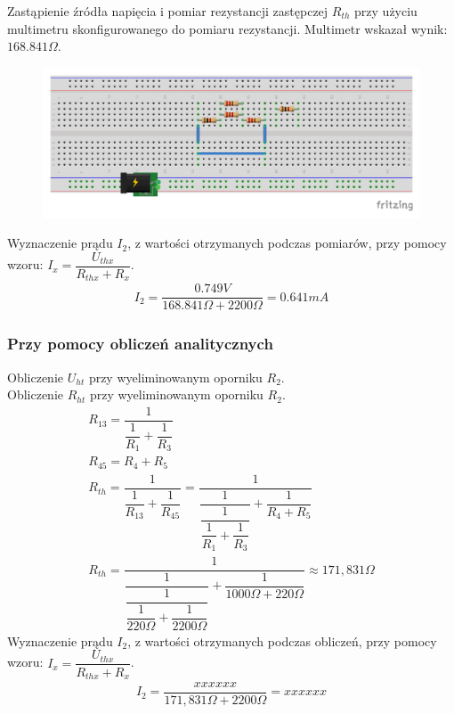 \documentclass[polish,polish,a4paper]{article}
\begin{document}
\begin{spacing}{2}
		Zastąpienie źródła napięcia i pomiar rezystancji zastępczej $R_{th}$ przy użyciu multimetru skonfigurowanego do pomiaru rezystancji. Multimetr wskazał wynik: $ 168.841\Omega $.
		\begin{figure}[H]
			\centering
			\includegraphics[scale=0.8]{R2_pomiar_oporu_bb.pdf}
		\end{figure}
		Wyznaczenie prądu $I_{2}$, z wartości otrzymanych podczas pomiarów, przy pomocy wzoru: $I_{x}= \dfrac{U_{thx}}{R_{thx} + R_{x}}$.
		\begin{gather*}
		I_{2}=\dfrac{0.749V}{168.841\Omega + 2200\Omega } = 0.641mA
		\end{gather*}
	\subsubsection{Przy pomocy obliczeń analitycznych}
	Obliczenie $U_{ht}$ przy wyeliminowanym oporniku $ R_{2} $.\\
	Obliczenie $R_{ht}$ przy wyeliminowanym oporniku $ R_{2} $.
	\begin{gather*}
	R_{13} = \dfrac{1}{\dfrac{1}{R_{1}} + \dfrac{1}{R_{3}}}\\
	R_{45} = R_{4} + R_{5}\\
	R_{th} = \dfrac{1}{\dfrac{1}{R_{13}} + \dfrac{1}{R_{45}}} = \dfrac{1}{\dfrac{1}{\dfrac{1}{\dfrac{1}{R_{1}} + \dfrac{1}{R_{3}}}} + \dfrac{1}{R_{4} + R_{5}}}\\
	R_{th} = \dfrac{1}{\dfrac{1}{\dfrac{1}{\dfrac{1}{220\Omega} + \dfrac{1}{2200\Omega}}} + \dfrac{1}{1000\Omega + 220\Omega}} \approx 171,831\Omega
	\end{gather*}
		Wyznaczenie prądu $I_{2}$, z wartości otrzymanych podczas obliczeń, przy pomocy wzoru: $I_{x}= \dfrac{U_{thx}}{R_{thx} + R_{x}}$.
	\begin{gather*}
	I_{2}=\dfrac{xxxxxx}{171,831\Omega + 2200\Omega } = xxxxxx
	\end{gather*}

\end{spacing}
\end{document}
